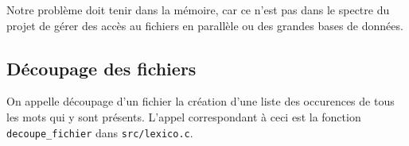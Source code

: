 Notre problème doit tenir dans la mémoire,
car ce n'est pas dans le spectre du projet de gérer des accès
au fichiers en parallèle ou des grandes bases de données.

\subsection{Découpage des fichiers}

On appelle découpage d'un fichier la création d'une
liste des occurences de tous les mots qui y sont présents.
L'appel correspondant à ceci est la fonction {\tt decoupe\_fichier}
dans {\tt src/lexico.c}.
